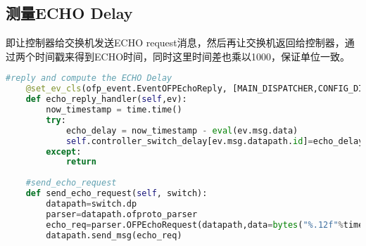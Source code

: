 \documentclass{xjtureport}
\begin{document}
\subsection{测量ECHO Delay}
即让控制器给交换机发送ECHO request消息，然后再让交换机返回给控制器，通过两个时间戳来得到ECHO时间，同时这里时间差也乘以1000，保证单位一致。
\begin{lstlisting}[language=python]
	#reply and compute the ECHO Delay
	@set_ev_cls(ofp_event.EventOFPEchoReply, [MAIN_DISPATCHER,CONFIG_DISPATCHER,HANDSHAKE_DISPATCHER])
	def echo_reply_handler(self,ev):
		now_timestamp = time.time()
		try:
			echo_delay = now_timestamp - eval(ev.msg.data)
			self.controller_switch_delay[ev.msg.datapath.id]=echo_delay*1000
		except:
			return
			
	#send_echo_request
	def send_echo_request(self, switch):
		datapath=switch.dp
		parser=datapath.ofproto_parser
		echo_req=parser.OFPEchoRequest(datapath,data=bytes("%.12f"%time.time()))
		datapath.send_msg(echo_req)	
\end{lstlisting}
\end{document}
